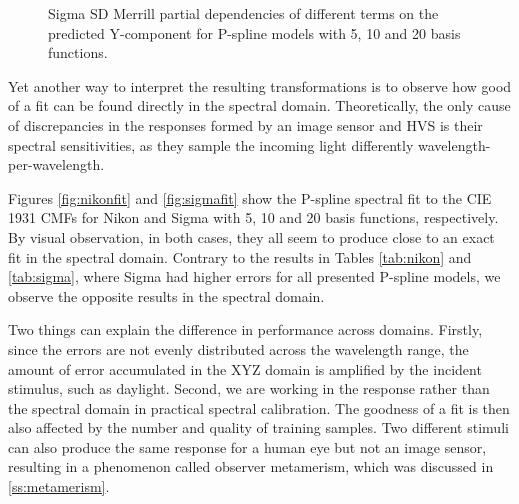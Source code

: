\begin{figure}
    \centering
    \caption{Sigma SD Merrill partial dependencies of different terms on the predicted Y-component for P-spline models with 5, 10 and 20 basis functions.}
    \label{fig:sigmaspline}
\end{figure}

Yet another way to interpret the resulting transformations is to observe how good of a fit can be found directly in the spectral domain. Theoretically, the only cause of discrepancies in the responses formed by an image sensor and HVS is their spectral sensitivities, as they sample the incoming light differently wavelength-per-wavelength.

Figures \ref{fig:nikonfit} and \ref{fig:sigmafit} show the P-spline spectral fit to the CIE 1931 CMFs for Nikon and Sigma with 5, 10 and 20 basis functions, respectively. By visual observation, in both cases, they all seem to produce close to an exact fit in the spectral domain. Contrary to the results in Tables \ref{tab:nikon} and \ref{tab:sigma}, where Sigma had higher errors for all presented P-spline models, we observe the opposite results in the spectral domain.

Two things can explain the difference in performance across domains. Firstly, since the errors are not evenly distributed across the wavelength range, the amount of error accumulated in the XYZ domain is amplified by the incident stimulus, such as daylight. Second, we are working in the response rather than the spectral domain in practical spectral calibration. The goodness of a fit is then also affected by the number and quality of training samples. Two different stimuli can also produce the same response for a human eye but not an image sensor, resulting in a phenomenon called observer metamerism, which was discussed in \ref{ss:metamerism}.

